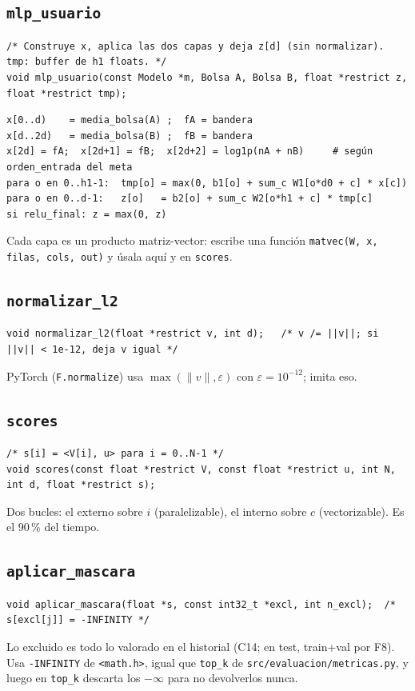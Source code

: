 \documentclass[a4paper,11pt]{article}
\newcommand{\cod}[1]{\texttt{#1}}
\begin{document}
\subsection{\texttt{mlp\_usuario}}
\begin{lstlisting}[style=c]
/* Construye x, aplica las dos capas y deja z[d] (sin normalizar). tmp: buffer de h1 floats. */
void mlp_usuario(const Modelo *m, Bolsa A, Bolsa B, float *restrict z, float *restrict tmp);
\end{lstlisting}
\begin{lstlisting}
x[0..d)    = media_bolsa(A) ;  fA = bandera
x[d..2d)   = media_bolsa(B) ;  fB = bandera
x[2d] = fA;  x[2d+1] = fB;  x[2d+2] = log1p(nA + nB)     # según orden_entrada del meta
para o en 0..h1-1:  tmp[o] = max(0, b1[o] + sum_c W1[o*d0 + c] * x[c])
para o en 0..d-1:   z[o]   = b2[o] + sum_c W2[o*h1 + c] * tmp[c]
si relu_final: z = max(0, z)
\end{lstlisting}
Cada capa es un producto matriz-vector: escribe una función \cod{matvec(W, x, filas, cols, out)} y úsala aquí y en
\cod{scores}.

\subsection{\texttt{normalizar\_l2}}
\begin{lstlisting}[style=c]
void normalizar_l2(float *restrict v, int d);   /* v /= ||v||; si ||v|| < 1e-12, deja v igual */
\end{lstlisting}
PyTorch (\cod{F.normalize}) usa $\max(\lVert v\rVert, \varepsilon)$ con $\varepsilon = 10^{-12}$; imita eso.

\subsection{\texttt{scores}}
\begin{lstlisting}[style=c]
/* s[i] = <V[i], u> para i = 0..N-1 */
void scores(const float *restrict V, const float *restrict u, int N, int d, float *restrict s);
\end{lstlisting}
Dos bucles: el externo sobre $i$ (paralelizable), el interno sobre $c$ (vectorizable). Es el 90\,\% del tiempo.

\subsection{\texttt{aplicar\_mascara}}
\begin{lstlisting}[style=c]
void aplicar_mascara(float *s, const int32_t *excl, int n_excl);  /* s[excl[j]] = -INFINITY */
\end{lstlisting}
Lo excluido es todo lo valorado en el historial (C14; en test, train+val por F8). Usa \cod{-INFINITY} de
\cod{<math.h>}, igual que \cod{top\_k} de \cod{src/evaluacion/metricas.py}, y luego en \cod{top\_k} descarta los
$-\infty$ para no devolverlos nunca.
\end{document}
